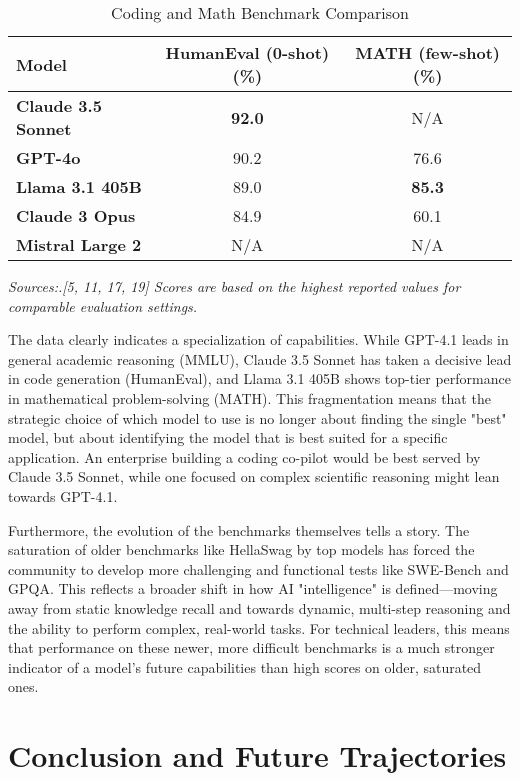 \documentclass[12pt, a4paper]{article}
\begin{document}
\begin{table}[h!]
\centering
\caption{Coding and Math Benchmark Comparison}
\label{tab:coding_bench}
\begin{tabular}{@{}lcc@{}}
\toprule
\textbf{Model} & \textbf{HumanEval (0-shot) (\%)} & \textbf{MATH (few-shot) (\%)} \\
\midrule
\textbf{Claude 3.5 Sonnet} & \textbf{92.0} & N/A \\
\textbf{GPT-4o} & 90.2 & 76.6 \\
\textbf{Llama 3.1 405B} & 89.0 & \textbf{85.3} \\
\textbf{Claude 3 Opus} & 84.9 & 60.1 \\
\textbf{Mistral Large 2} & N/A & N/A \\
\bottomrule
\end{tabular}
\end{table}
\textit{Sources:.[5, 11, 17, 19] Scores are based on the highest reported values for comparable evaluation settings.}

The data clearly indicates a specialization of capabilities. While GPT-4.1 leads in general academic reasoning (MMLU), Claude 3.5 Sonnet has taken a decisive lead in code generation (HumanEval), and Llama 3.1 405B shows top-tier performance in mathematical problem-solving (MATH). This fragmentation means that the strategic choice of which model to use is no longer about finding the single "best" model, but about identifying the model that is best suited for a specific application. An enterprise building a coding co-pilot would be best served by Claude 3.5 Sonnet, while one focused on complex scientific reasoning might lean towards GPT-4.1.

Furthermore, the evolution of the benchmarks themselves tells a story. The saturation of older benchmarks like HellaSwag by top models has forced the community to develop more challenging and functional tests like SWE-Bench and GPQA. This reflects a broader shift in how AI "intelligence" is defined—moving away from static knowledge recall and towards dynamic, multi-step reasoning and the ability to perform complex, real-world tasks. For technical leaders, this means that performance on these newer, more difficult benchmarks is a much stronger indicator of a model's future capabilities than high scores on older, saturated ones.

\section{Conclusion and Future Trajectories}
\end{document}
